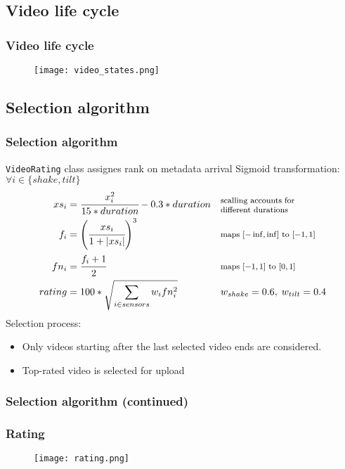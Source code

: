 \subsection{Video life cycle}
\begin{frame}[fragile]	
	\frametitle{Video life cycle}
	\begin{figure}[!t]
		\centering
		\texttt{[image: video\_states.png]}
		\label{fig:states}
	\end{figure}
\end{frame}

\subsection{Selection algorithm}
\begin{frame}	
	\frametitle{Selection algorithm}
	\texttt{VideoRating} class assignes rank on metadata arrival
	Sigmoid transformation: $\forall i \in \{shake, tilt\}$
	\begin{align*}
		xs_i &= \cfrac{x_i^2}{15 * duration} - 0.3 * duration 
			&&\parbox{10em}{\footnotesize scalling accounts for \\ different durations}\\
		f_i  &= \left(\cfrac{xs_i}{1+|xs_i|}\right)^3
			&& \parbox{10em}{\footnotesize maps $[-\inf,\inf]$ to $[-1, 1]$}\\
		fn_i &= \cfrac{f_i + 1}{2}
			&& \parbox{10em}{\footnotesize maps $[-1,1]$ to $[0,1]$}\\
		rating &= 100 * \sqrt{ \sum\limits_{i \in sensors}{w_i fn_i^2} } 
			&&w_{shake} = 0.6,\; w_{tilt} = 0.4
		\end{align*}
	Selection process:
	\begin{itemize}
		\item Only videos starting after the last selected video ends are considered.
		\item Top-rated video is selected for upload
	\end{itemize}
\end{frame}

\begin{frame}	
	\frametitle{Selection algorithm (continued)}
	\begin{figure}[!t]
		\centering
		\hfill
	\end{figure}
\end{frame}

\begin{frame}	
	\frametitle{Rating}
	\begin{figure}[!t]
		\centering
		\texttt{[image: rating.png]}
		\label{fig:rating}
	\end{figure}
\end{frame}
